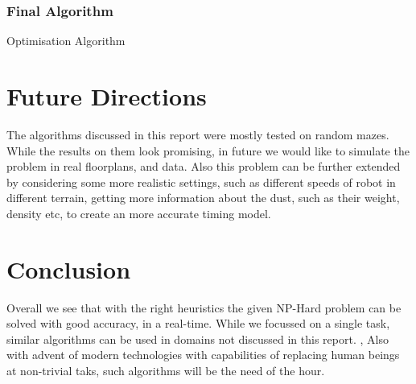\documentclass{article}
\begin{document}
\subsubsection{Final Algorithm}

\begin{algorithm}[H]
    \SetAlgoLined
\caption{Optimisation Algorithm}
\end{algorithm}

 

\section{Future Directions}

The algorithms discussed in this report were mostly tested on random mazes. While the results on them look promising, in future we would like to simulate the problem in real floorplans, and data.
Also this problem can be further extended by considering some more realistic settings, such as different speeds of robot in different terrain, getting more information about the dust, such as their weight, density etc, to create an more accurate timing model.

\section{Conclusion}


Overall we see that with the right heuristics the given NP-Hard problem can be solved with good accuracy, in a real-time. While we focussed on a single task, similar algorithms can be used 
in domains not discussed in this report. \cite{apps1},\cite{apps2} Also with advent of modern technologies with capabilities of replacing human beings at non-trivial taks, such algorithms will be the need of the hour.





\end{document}
